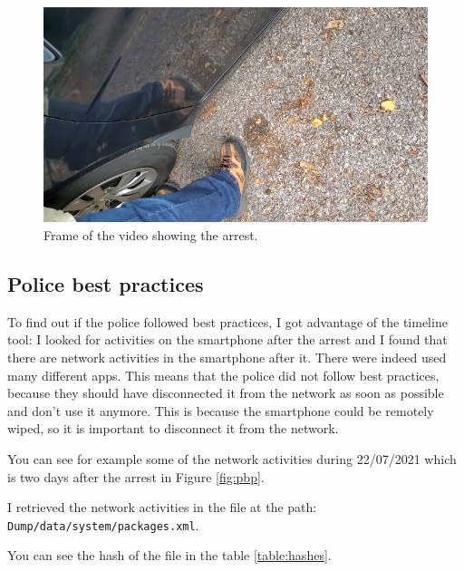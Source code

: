 \documentclass[12pt]{article}
\begin{document}
\begin{figure}[!ht]
    \centering
    \includegraphics[width=\textwidth]{images/arrest-frame.png}
    \caption{Frame of the video showing the arrest.}
    \label{fig:rec-file}
\end{figure}

\subsection{Police best practices}

To find out if the police followed best practices, I got advantage of the timeline tool: I looked for activities on the smartphone after the arrest and I found that there are network activities in the smartphone after it. There were indeed used many different apps.
This means that the police did not follow best practices, because they should have disconnected it from the network as soon as possible and don't use it anymore. This is because the smartphone could be remotely wiped, so it is important to disconnect it from the network.

You can see for example some of the network activities during 22/07/2021 which is two days after the arrest in Figure \ref{fig:pbp}.

I retrieved the network activities in the file at the path:\\ \texttt{Dump/data/system/packages.xml}.

You can see the hash of the file in the table \ref{table:hashes}.
\end{document}

